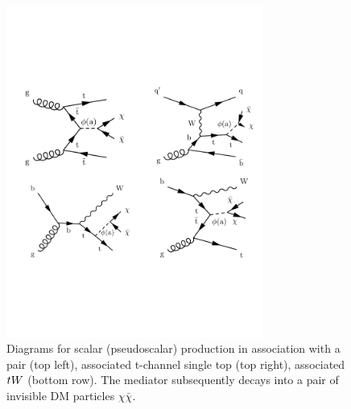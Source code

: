 \begin{figure}[htb!]
    \centering
    \includegraphics[width=0.75\textwidth]{figs/ftan/bsm_dm_diagrams}
\caption{Diagrams for scalar (pseudoscalar) production in association with a
\ttbar pair (top left), associated t-channel single top (top right),
associated $tW$ (bottom row). The mediator subsequently decays into 
a pair of invisible DM particles $\chi\bar{\chi}$.}
\label{fig:dm_diagrams}
\end{figure}

